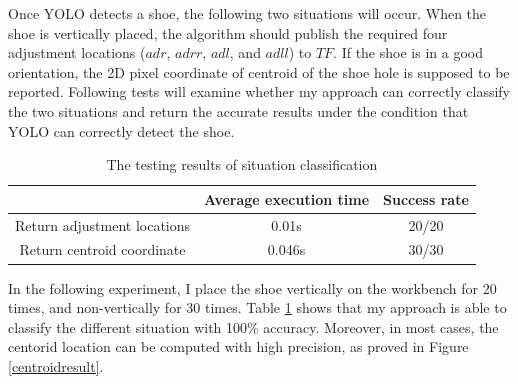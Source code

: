 Once YOLO detects a shoe, the following two situations will occur. When the shoe is vertically placed, the algorithm should publish the required four adjustment locations ($adr$, $adrr$, $adl$, and $adll$) to $TF$. If the shoe is in a good orientation, the 2D pixel coordinate of centroid of the shoe hole is supposed to be reported. Following tests will examine whether my approach can correctly classify the two situations and return the accurate results under the condition that YOLO can correctly detect the shoe.

\begin{table}[H]
\centering
\begin{tabular}{||c||c|c||}
\hline
 & Average execution time & Success rate \\ \hline \hline
Return adjustment locations & 0.01s & 20/20 \\ \hline
Return centroid coordinate & 0.046s & 30/30 \\ \hline
\end{tabular}
\caption{The testing results of situation classification}
\label{locationtest}
\end{table}

In the following experiment, I place the shoe vertically on the workbench for 20 times, and non-vertically for 30 times. Table \ref{locationtest} shows that my approach is able to classify the different situation with 100\% accuracy. Moreover, in most cases, the centorid location can be computed with high precision, as proved in Figure \ref{centroidresult}. 

